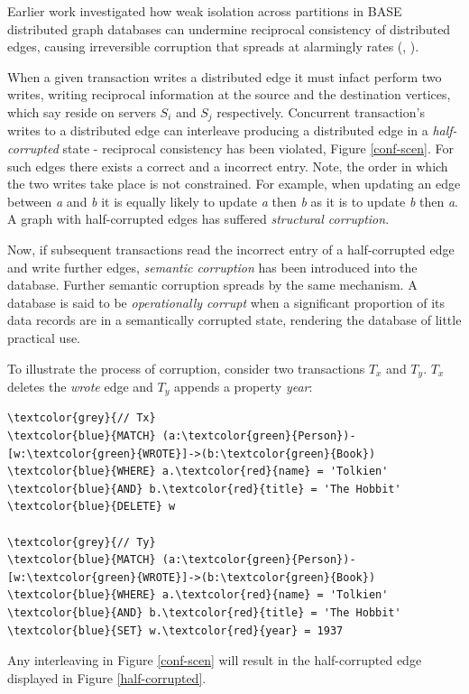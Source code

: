 \documentclass[sigplan,10pt]{acmart}
\begin{document}
Earlier work investigated how weak isolation across partitions in BASE distributed graph databases can undermine reciprocal consistency of distributed edges, causing irreversible corruption that spreads at alarmingly rates (\cite{Ezhilchelvan2018}, \cite{Webber2019}).

When a given transaction writes a distributed edge it must infact perform two writes, writing reciprocal information at the source and the destination vertices, which say reside on servers $S_i$ and $S_j$ respectively. Concurrent transaction's writes to a distributed edge can interleave producing a distributed edge in a \emph{half-corrupted} state - reciprocal consistency has been violated, Figure \ref{conf-scen}. For such edges there exists a correct and a incorrect entry. Note, the order in which the two writes take place is not constrained. For example, when updating an edge between \emph{a} and \emph{b} it is equally likely to update \emph{a} then \emph{b} as it is to update \emph{b} then \emph{a}. A graph with half-corrupted edges has suffered \emph{structural corruption}.

Now, if subsequent transactions read the incorrect entry of a half-corrupted edge and write further edges, \emph{semantic corruption} has been introduced into the database. Further semantic corruption spreads by the same mechanism. A database is said to be \emph{operationally corrupt} when a significant proportion of its data records are in a semantically corrupted state, rendering the database of little practical use.

To illustrate the process of corruption, consider two transactions $T_x$ and $T_y$. $T_x$ deletes the \emph{wrote} edge and $T_y$ appends a property \emph{year}:
\begin{Verbatim}[commandchars=\\\{\},fontsize=\small,xleftmargin=.2in]
\textcolor{grey}{// Tx}
\textcolor{blue}{MATCH} (a:\textcolor{green}{Person})-[w:\textcolor{green}{WROTE}]->(b:\textcolor{green}{Book})
\textcolor{blue}{WHERE} a.\textcolor{red}{name} = 'Tolkien' \textcolor{blue}{AND} b.\textcolor{red}{title} = 'The Hobbit'
\textcolor{blue}{DELETE} w

\textcolor{grey}{// Ty}
\textcolor{blue}{MATCH} (a:\textcolor{green}{Person})-[w:\textcolor{green}{WROTE}]->(b:\textcolor{green}{Book})
\textcolor{blue}{WHERE} a.\textcolor{red}{name} = 'Tolkien' \textcolor{blue}{AND} b.\textcolor{red}{title} = 'The Hobbit'
\textcolor{blue}{SET} w.\textcolor{red}{year} = 1937
\end{Verbatim}
Any interleaving in Figure \ref{conf-scen} will result in the half-corrupted edge displayed in Figure \ref{half-corrupted}.
\end{document}

